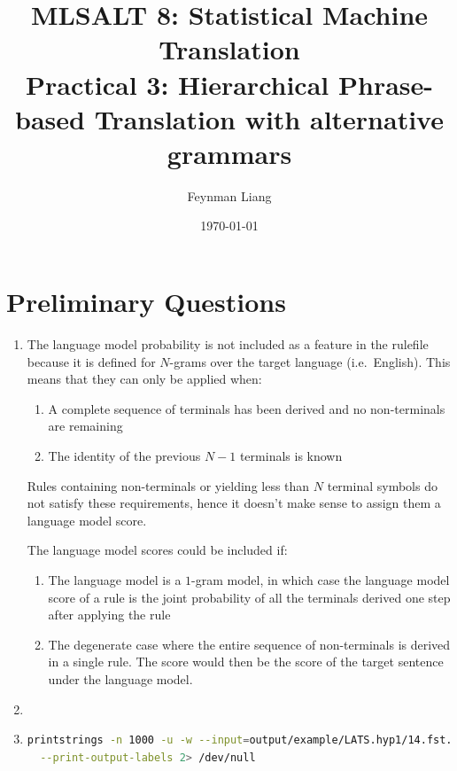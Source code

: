 \documentclass[a4paper,oneside,reqno]{amsart}
\newcommand{\authorname}{Feynman Liang}
\newcommand{\coursename}{MLSALT 8: Statistical Machine Translation}
\newcommand{\assignmentname}{Practical 3: Hierarchical Phrase-based Translation
with alternative grammars}
\begin{document}
\title{\coursename\\\assignmentname}

\author{\authorname}
\date{\today}

\maketitle

\section{Preliminary Questions}
\begin{enumerate}[label=\arabic*.]
  \item The language model probability is not included as a feature in the
    rulefile because it is defined for $N$-grams over the target language
    (i.e.\ English). This means that they can only be applied when:
    \begin{enumerate}
      \item A complete sequence of terminals has been derived and no
        non-terminals are remaining
      \item The identity of the previous $N-1$ terminals is known
    \end{enumerate}
    Rules containing non-terminals or yielding less than $N$ terminal symbols
    do not satisfy these requirements, hence it doesn't make sense to assign
    them a language model score.

    The language model scores could be included if:
    \begin{enumerate}
      \item The language model is a $1$-gram model, in which case the language
        model score of a rule is the joint probability of all the terminals
        derived one step after applying the rule
      \item The degenerate case where the entire sequence of non-terminals is
        derived in a single rule. The score would then be the score of the
        target sentence under the language model.
    \end{enumerate}

  \item %

  \item %
    \begin{lstlisting}[language=bash]
printstrings -n 1000 -u -w --input=output/example/LATS.hyp1/14.fst.gz \
  --print-output-labels 2> /dev/null
    \end{lstlisting}


\end{enumerate}
\end{document}
